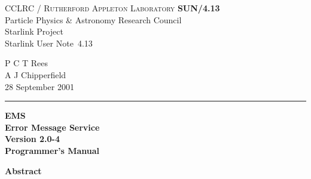 \documentclass[twoside,11pt]{article}
\newcommand{\stardoccategory}  {Starlink User Note}
\newcommand{\stardocinitials}  {SUN}
\newcommand{\stardocnumber}    {4.13}
\newcommand{\stardocauthors}   {P C T Rees \\
                                A J Chipperfield}
\newcommand{\stardocdate}      {28 September 2001}
\newcommand{\stardoctitle}     {EMS \\ [1ex]
                                Error Message Service}
\newcommand{\stardocversion}   {Version 2.0-4}
\newcommand{\stardocmanual}    {Programmer's Manual}
\newcommand{\stardocname}{\stardocinitials /\stardocnumber}
\newenvironment{latexonly}{}{}
\renewcommand{\_}{\texttt{\symbol{95}}}
\begin{document}
\thispagestyle{empty}

\begin{latexonly}
   CCLRC / \textsc{Rutherford Appleton Laboratory} \hfill \textbf{\stardocname}\\
   {\large Particle Physics \& Astronomy Research Council}\\
   {\large Starlink Project\\}
   {\large \stardoccategory\ \stardocnumber}
   \begin{flushright}
   \stardocauthors\\
   \stardocdate
   \end{flushright}
   \vspace{-4mm}
   \rule{\textwidth}{0.5mm}
   \vspace{5mm}
   \begin{center}
   {\Huge\textbf{\stardoctitle \\ [2.5ex]}}
   {\LARGE\textbf{\stardocversion \\ [4ex]}}
   {\Huge\textbf{\stardocmanual}}
   \end{center}
   \vspace{5mm}


   \vspace{10mm}
   \begin{center}
      {\Large\textbf{Abstract}}
   \end{center}
\end{latexonly}
\end{document}

